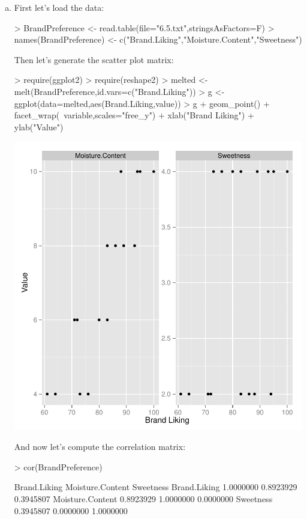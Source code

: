 \documentclass{article}
\begin{document}
\begin{enumerate}[a)]
\item{} First let's load the data:

\begin{Schunk}
\begin{Sinput}
> BrandPreference <- read.table(file="6.5.txt",stringsAsFactors=F)
> names(BrandPreference) <- c("Brand.Liking","Moisture.Content","Sweetness")
\end{Sinput}
\end{Schunk}

Then let's generate the scatter plot matrix:

\begin{Schunk}
\begin{Sinput}
> require(ggplot2)
> require(reshape2)
> melted <- melt(BrandPreference,id.vars=c("Brand.Liking"))
> g <- ggplot(data=melted,aes(Brand.Liking,value))
> g + geom_point() + facet_wrap(~variable,scales="free_y") + xlab("Brand Liking") + ylab("Value")
\end{Sinput}
\end{Schunk}
\includegraphics{Fig-scatterplot}

And now let's compute the correlation matrix:

\begin{Schunk}
\begin{Sinput}
> cor(BrandPreference)
\end{Sinput}
\begin{Soutput}
                 Brand.Liking Moisture.Content Sweetness
Brand.Liking        1.0000000        0.8923929 0.3945807
Moisture.Content    0.8923929        1.0000000 0.0000000
Sweetness           0.3945807        0.0000000 1.0000000
\end{Soutput}
\end{Schunk}


\end{enumerate}
\end{document}
